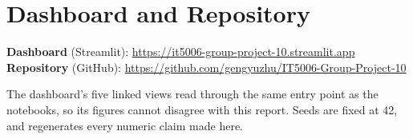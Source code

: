 \section{Dashboard and Repository}

\noindent
\textbf{Dashboard} (Streamlit):
\url{https://it5006-group-project-10.streamlit.app} \\
\textbf{Repository} (GitHub):
\url{https://github.com/gengyuzhu/IT5006-Group-Project-10}

\noindent
The dashboard's five linked views read through the same
 entry point as the notebooks, so its figures cannot
disagree with this report. Seeds are fixed at 42, and
 regenerates every numeric claim made here.
